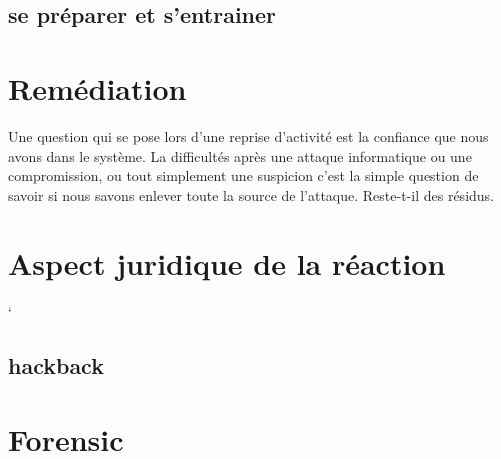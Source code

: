 \subsection{se préparer et s'entrainer}

\section{Remédiation}




Une question qui se pose lors d’une reprise d’activité est la confiance que nous avons dans le système. La difficultés après une attaque informatique ou une compromission, ou tout simplement une suspicion c’est la simple question de savoir si nous savons enlever toute la source de l’attaque. Reste-t-il des résidus.

\section{Aspect juridique de la réaction}
`
\subsection{hackback}

\section{Forensic}
